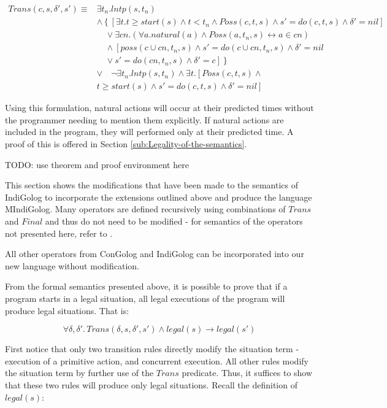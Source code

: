 \documentclass{llncs}
\begin{document}
\begin{align*}
Trans(c,s,\delta',s')\equiv & \exists t_{n}. lntp(s,t_{n}) \\
  & \wedge \left\{ \left[\exists t.t\geq start(s)\wedge t<t_{n}\wedge Poss(c,t,s)\wedge s'=do(c,t,s)\wedge\delta'=nil\right]\right.\\
  &  \quad\vee\exists cn.\left(\forall a.natural(a)\wedge Poss(a,t_{n},s)\leftrightarrow a\in cn\right)\\
  & \quad\wedge\left[poss(c\cup cn,t_{n},s)\wedge s'=do(c\cup cn,t_{n},s)\wedge\delta'=nil\right.\\
  & \quad\vee\left.\left.s'=do(cn,t_{n},s)\wedge\delta'=c\right]\right\}\\
  & \vee\quad\neg\exists t_{n}.lntp(s,t_{n})\wedge\exists t.\left[Poss(c,t,s)\wedge\right.\\
  & \left.t\geq start(s)\wedge s'=do(c,t,s)\wedge\delta'=nil\right]
\end{align*}


Using this formulation, natural actions will occur at their predicted
times without the programmer needing to mention them explicitly. If
natural actions are included in the program, they will performed only
at their predicted time. A proof of this is offered in Section \ref{sub:Legality-of-the-semantics}.

TODO: use theorem and proof environment here

This section shows the modifications that have been made to the semantics
of IndiGolog to incorporate the extensions outlined above and produce
the language MIndiGolog. Many operators are defined recursively using
combinations of $Trans$ and $Final$ and thus do not need to be modified
- for semantics of the operators not presented here, refer to \cite{giacomo00congolog,giacomo99indigolog}.

All other operators from ConGolog and IndiGolog can be incorporated
into our new language without modification.

From the formal semantics presented above, it is possible to prove
that if a program starts in a legal situation, all legal executions
of the program will produce legal situations. That is:

\[
\forall\delta,\delta'.\, Trans(\delta,s,\delta',s')\wedge legal(s)\rightarrow legal(s')\]


First notice that only two transition rules directly modify the situation
term - execution of a primitive action, and concurrent execution.
All other rules modify the situation term by further use of the $Trans$
predicate. Thus, it suffices to show that these two rules will produce
only legal situations. Recall the definition of $legal(s)$:
\end{document}
